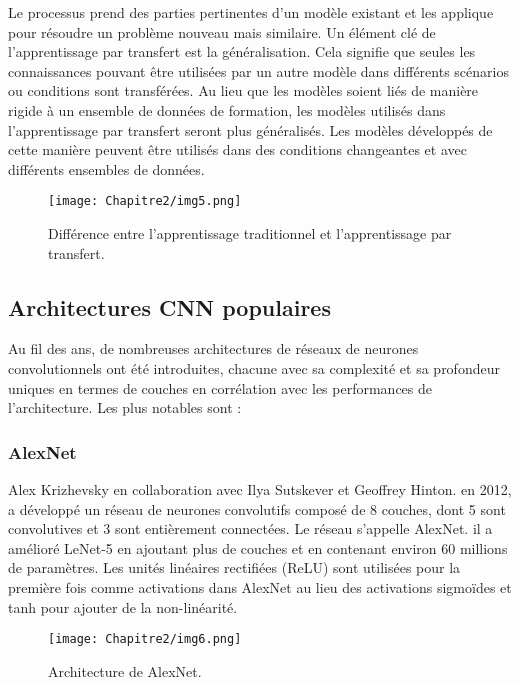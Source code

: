      Le processus prend des parties pertinentes d'un modèle existant et les applique pour résoudre un problème nouveau mais similaire. Un élément clé de l'apprentissage par transfert est la généralisation. Cela signifie que seules les connaissances pouvant être utilisées par un autre modèle dans différents scénarios ou conditions sont transférées. Au lieu que les modèles soient liés de manière rigide à un ensemble de données de formation, les modèles utilisés dans l'apprentissage par transfert seront plus généralisés. Les modèles développés de cette manière peuvent être utilisés dans des conditions changeantes et avec différents ensembles de données.
     \begin{figure}[H]
          \centering
          \texttt{[image: Chapitre2/img5.png]}
          \caption{Différence entre l'apprentissage traditionnel et l'apprentissage par transfert.}
          \label{img5}
          \end{figure}

     \subsection{Architectures CNN populaires} 
     Au fil des ans, de nombreuses architectures de réseaux de neurones convolutionnels ont été introduites, chacune avec sa complexité et sa profondeur uniques en termes de couches en corrélation avec les performances de l'architecture. Les plus notables sont :
     
          \subsubsection{AlexNet} \cite{alexnet_paper}
          Alex Krizhevsky en collaboration avec Ilya Sutskever et Geoffrey Hinton. en 2012, a développé un réseau de neurones convolutifs composé de 8 couches, dont 5 sont convolutives et 3 sont entièrement connectées. Le réseau s'appelle AlexNet. il a amélioré LeNet-5 en ajoutant plus de couches et en contenant environ 60 millions de paramètres. Les unités linéaires rectifiées (ReLU) sont utilisées pour la première fois comme activations dans AlexNet au lieu des activations sigmoïdes et tanh pour ajouter de la non-linéarité.
          \begin{figure}[H]
               \centering
               \texttt{[image: Chapitre2/img6.png]}
               \caption{Architecture de AlexNet.}
               \label{img6}
               \end{figure}

